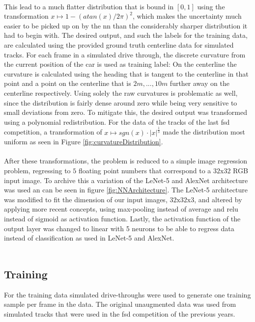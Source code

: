 \\This lead to a much flatter distribution that is bound in $[0,1]$ using the transformation $x \mapsto 1-(atan(x)/2\pi)^2$, which makes the uncertainty much easier to be picked up on by the \ac{nn}\cite{Sola1997} than the considerably sharper distribution it had to begin with. 
The desired output, and such the labels for the training data, are calculated using the provided ground truth centerline data for simulated tracks. For each frame in a simulated drive through, the discrete curvature from the current position of the car is used as training label: On the centerline the curvature is calculated using the heading that is tangent to the centerline in that point and a point on the centerline that is $2m, ..., 10m$ further away on the centerline respectively. Using solely the raw curvatures is problematic as well, since the distribution is fairly dense around zero while being very sensitive to small deviations from zero. To mitigate this, the desired output was transformed using a polynomial redistribution. For the data of the tracks of the last \ac{fsd} competition, a transformation of $x \mapsto sgn(x)\cdot |x|^\frac{1}{3}$ made the distribution most uniform as seen in Figure \ref{fig:curvatureDistribution}.
\\
\\
After these transformations, the problem is reduced to a simple image regression problem, regressing to $5$ floating point numbers that correspond to a $32\text{x}32$ RGB input image. To archive this a variation of the  LeNet-5\cite{Lecun1998} and AlexNet\cite{Alex2012} architecture was used an can be seen in figure \ref{fig:NNArchitecture}. The LeNet-5 architecture was modified to fit the dimension of our input images, $32\text{x}32\text{x}3$, and altered by applying more recent concepts, using max-pooling instead of average and \ac{relu} instead of sigmoid as activation function. Lastly, the activation function of the output layer was changed to linear with 5 neurons to be able to regress data instead of classification as used in LeNet-5\cite{Lecun1998} and AlexNet\cite{Alex2012}. 
 \\
\\
\subsection{Training}
For the training data simulated drive-throughs were used to generate one training sample per frame in the data. The original unaugmented data was used
from simulated tracks that were used in the \ac{fsd} competition of the previous years.